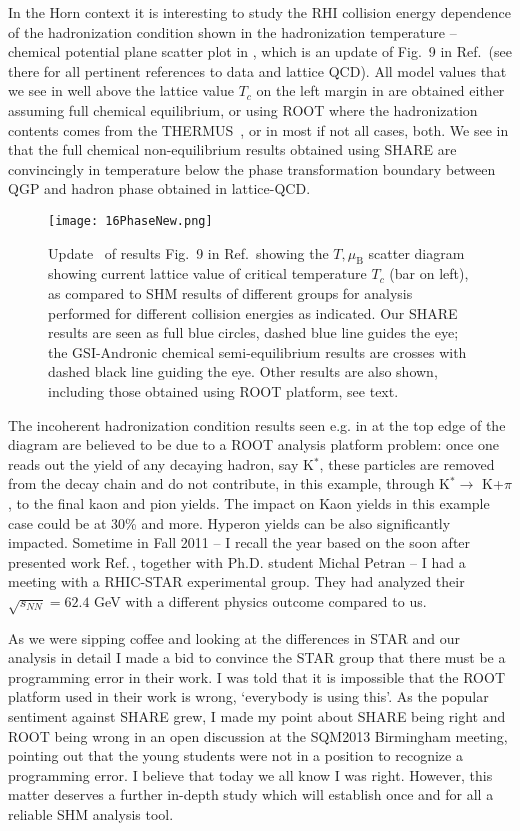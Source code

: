 \documentclass{appolb}
\begin{document}
In the Horn context it is interesting to study the RHI collision energy dependence of the hadronization condition  shown in the hadronization temperature -- chemical potential plane scatter plot in , which is an update of Fig.~9 in Ref.\,\cite{Rafelski:2015cxa} (see there for all pertinent references to data and lattice QCD). All model values that we see in  well above the lattice value $T_c$ on the left margin in  are obtained either assuming full chemical equilibrium, or using ROOT where the hadronization contents comes from the  THERMUS~\cite{Wheaton:2011rw}, or in most if not all cases, both. We see in  that the full chemical non-equilibrium results obtained using SHARE are convincingly in temperature below the phase transformation boundary between QGP and hadron phase obtained in lattice-QCD. 
\begin{figure}[bht]
\centerline{%
\texttt{[image: 16PhaseNew.png]}}
\caption{Update~\cite{Petran:2016} of results Fig.~9 in Ref.\,\cite{Rafelski:2015cxa} showing the $T,\mu_\mathrm{B}$ scatter diagram showing current lattice value of critical temperature $T_c$ (bar on left), as compared to SHM results of different groups for analysis performed for different collision energies as indicated. Our SHARE results are seen as full blue circles, dashed blue line guides the eye; the GSI-Andronic chemical semi-equilibrium results are crosses with dashed black line guiding the eye. Other results are also shown, including those obtained using ROOT platform, see text.}
\label{TEcol}
\end{figure}


The incoherent   hadronization condition results seen e.g. in  at the top edge  of the diagram are believed to be due to a ROOT analysis platform problem:  once one reads out the yield of any decaying hadron, say K$^*$, these particles are removed from the decay chain and do not contribute, in this example, through K$^*\to$ K+$\pi$, to the final kaon and pion yields. The impact on Kaon yields in this example case could be at 30\% and more. Hyperon yields can be also significantly impacted. Sometime in Fall 2011 -- I recall the year based on the soon after presented work Ref.\,\cite{Petran:2011aa}, together with Ph.D. student Michal Petran -- I had a meeting with a RHIC-STAR experimental group. They had analyzed their $\sqrt{s_{NN}}=62.4$ GeV  with a different physics outcome compared to us. 

As we were sipping coffee and looking at the differences in STAR and our analysis in detail I made a bid to convince the STAR group that there must be a programming error in their work. I was told that it is impossible that the ROOT platform used in their work is wrong, \lq everybody is using this\rq. As the popular sentiment against SHARE grew, I made my point about SHARE being right and ROOT being wrong in an open discussion at the SQM2013 Birmingham meeting, pointing out that the young students were not in a position to recognize a programming error. I believe that today we all know I was right. However, this matter deserves a further in-depth study which will establish once and for all a reliable  SHM analysis tool.
\end{document}
